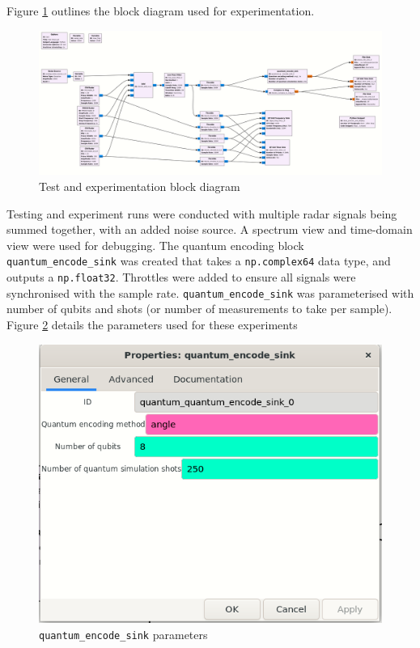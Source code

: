 Figure \ref{fig:test_bed} outlines the block diagram used for experimentation.
% 
\begin{figure}[ht]
    \centering
    \includegraphics[width=1\textwidth]{Figures/test_bed.png}
    \caption{Test and experimentation block diagram}
    \label{fig:test_bed}
\end{figure}
Testing and experiment runs were conducted with multiple radar signals being summed together, with an added noise source.
A spectrum view and time-domain view were used for debugging.
The quantum encoding block \lstinline{quantum_encode_sink} was created that takes a \lstinline{np.complex64} data type, and outputs a \lstinline{np.float32}.
Throttles were added to ensure all signals were synchronised with the sample rate.
\lstinline{quantum_encode_sink} was parameterised with number of qubits and shots (or number of measurements to take per sample).
Figure \ref{fig:quantum_encode_sink_parameters} details the parameters used for these experiments
% 
\begin{figure}[ht]
    \centering
    \includegraphics[width=1\textwidth]{Figures/quantum_encode_sink_parameters.png}
    \caption{\lstinline{quantum_encode_sink} parameters}
    \label{fig:quantum_encode_sink_parameters}
\end{figure}


